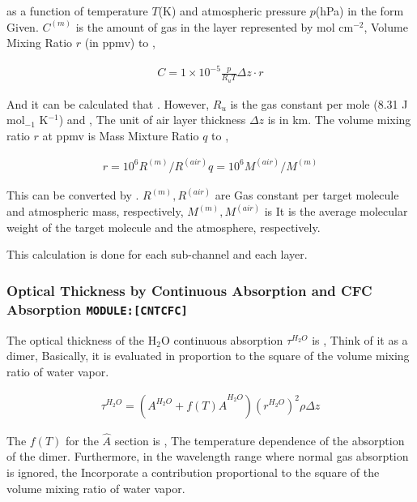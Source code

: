 as a function of temperature \(T\)(K) and atmospheric pressure
\(p\)(hPa) in the form Given. \(C^{(m)}\) is the amount of gas in the
layer represented by mol cm\(^{-2}\), Volume Mixing Ratio \(r\) (in
ppmv) to ,

\begin{eqnarray}
  C = 1\times 10^{-5} \frac{p}{R_u T} \Delta z \cdot r
\end{eqnarray}

And it can be calculated that . However, \(R_u\) is the gas constant per
mole (8.31 J mol\(_{-1}\) K\(^{-1}\)) and , The unit of air layer
thickness \(\Delta z\) is in km. The volume mixing ratio \(r\) at ppmv
is Mass Mixture Ratio \(q\) to ,

\begin{eqnarray}
  r = 10^6 R^{(m)}/R^{(air)} q = 10^6 M^{(air)}/M^{(m)}
\end{eqnarray}

This can be converted by . \(R^{(m)},R^{(air)}\) are Gas constant per
target molecule and atmospheric mass, respectively,
\(M^{(m)},M^{(air)}\) is It is the average molecular weight of the
target molecule and the atmosphere, respectively.

This calculation is done for each sub-channel and each layer.

\hypertarget{optical-thickness-by-continuous-absorption-and-cfc-absorption-modulecntcfc}{%
\subsubsection{\texorpdfstring{Optical Thickness by Continuous
Absorption and CFC Absorption
\texttt{MODULE:{[}CNTCFC{]}}}{Optical Thickness by Continuous Absorption and CFC Absorption MODULE:{[}CNTCFC{]}}}\label{optical-thickness-by-continuous-absorption-and-cfc-absorption-modulecntcfc}}

The optical thickness of the H\(_2\)O continuous absorption
\(\tau^{H_2O}\) is , Think of it as a dimer, Basically, it is evaluated
in proportion to the square of the volume mixing ratio of water vapor.

\begin{eqnarray}
\tau^{H_2O} = ( A^{H_2O} + f(T) \hat{A}^{H_2O} ) (r^{H_2O})^2 \rho \Delta z
\end{eqnarray}

The \(f(T)\) for the \(\hat{A}\) section is , The temperature dependence
of the absorption of the dimer. Furthermore, in the wavelength range
where normal gas absorption is ignored, the Incorporate a contribution
proportional to the square of the volume mixing ratio of water vapor.

